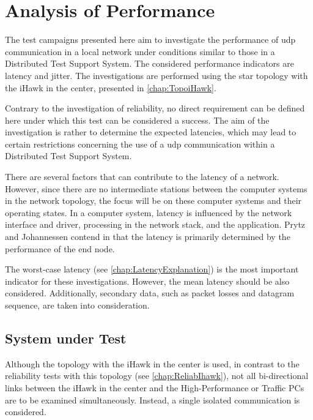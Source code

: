 \chapter{Analysis of Performance} \label{chap:perfAnalysis}
The test campaigns presented here aim to investigate the performance of \ac{udp} communication in a local network under conditions similar to those in a Distributed Test Support System. The considered performance indicators are latency and jitter. The investigations are performed using the star topology with the iHawk in the center, presented in \ref{chap:TopoiHawk}.

Contrary to the investigation of reliability, no direct requirement can be defined here under which this test can be considered a success. The aim of the investigation is rather to determine the expected latencies, which may lead to certain restrictions concerning the use of a \ac{udp} communication within a Distributed Test Support System.

There are several factors that can contribute to the latency of a network. However, since there are no intermediate stations between the computer systems in the network topology, the focus will be on these computer systems and their operating states. In a computer system, latency is influenced by the network interface and driver, processing in the network stack, and the application. Prytz and Johannessen contend in \cite{perfnew01} that the latency is primarily determined by the performance of the end node.

The worst-case latency (see \ref{chap:LatencyExplanation}) is the most important indicator for these investigations. However, the mean latency should be also considered. Additionally, secondary data, such as packet losses and datagram sequence, are taken into consideration.

\section{System under Test}
Although the topology with the iHawk in the center is used, in contrast to the reliability tests with this topology (see \ref{chap:ReliabIhawk}), not all bi-directional links between the iHawk in the center and the High-Performance or Traffic PCs are to be examined simultaneously. Instead, a single isolated communication is considered.

